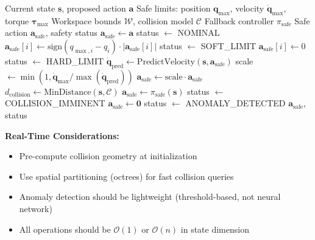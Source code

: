\begin{algorithm}[H]
\caption{Multi-Layer Safety Monitor}
\label{alg:safety_monitor}
\begin{algorithmic}[1]
\REQUIRE Current state $\mathbf{s}$, proposed action $\mathbf{a}$
\REQUIRE Safe limits: position $\mathbf{q}_{\max}$, velocity $\dot{\mathbf{q}}_{\max}$, torque $\boldsymbol{\tau}_{\max}$
\REQUIRE Workspace bounds $\mathcal{W}$, collision model $\mathcal{C}$
\REQUIRE Fallback controller $\pi_{\text{safe}}$
\ENSURE Safe action $\mathbf{a}_{\text{safe}}$, safety status
\STATE $\mathbf{a}_{\text{safe}} \gets \mathbf{a}$
\STATE status $\gets$ NOMINAL
\STATE
\STATE {}
        \STATE $\mathbf{a}_{\text{safe}}[i] \gets \text{sign}(q_{\max,i} - q_i) \cdot |\mathbf{a}_{\text{safe}}[i]|$ 
        \STATE status $\gets$ SOFT\_LIMIT
    \ENDIF
        \STATE $\mathbf{a}_{\text{safe}}[i] \gets 0$ 
        \STATE status $\gets$ HARD\_LIMIT
    \ENDIF
\ENDFOR
\STATE
\STATE {}
\STATE $\dot{\mathbf{q}}_{\text{pred}} \gets \text{PredictVelocity}(\mathbf{s}, \mathbf{a}_{\text{safe}})$
\STATE scale $\gets \min(1, \dot{\mathbf{q}}_{\max} / \max(\dot{\mathbf{q}}_{\text{pred}}))$
\STATE $\mathbf{a}_{\text{safe}} \gets \text{scale} \cdot \mathbf{a}_{\text{safe}}$
\STATE
\STATE {}
\STATE $d_{\text{collision}} \gets \text{MinDistance}(\mathbf{s}, \mathcal{C})$
    \STATE $\mathbf{a}_{\text{safe}} \gets \pi_{\text{safe}}(\mathbf{s})$ 
    \STATE status $\gets$ COLLISION\_IMMINENT
\ENDIF
\STATE
\STATE {}
    \STATE $\mathbf{a}_{\text{safe}} \gets \mathbf{0}$ 
    \STATE status $\gets$ ANOMALY\_DETECTED
\ENDIF
\RETURN $\mathbf{a}_{\text{safe}}$, status
\end{algorithmic}
\end{algorithm}

\textbf{Real-Time Considerations:}
\begin{itemize}
    \item Pre-compute collision geometry at initialization
    \item Use spatial partitioning (octrees) for fast collision queries
    \item Anomaly detection should be lightweight (threshold-based, not neural network)
    \item All operations should be $\mathcal{O}(1)$ or $\mathcal{O}(n)$ in state dimension
\end{itemize}

